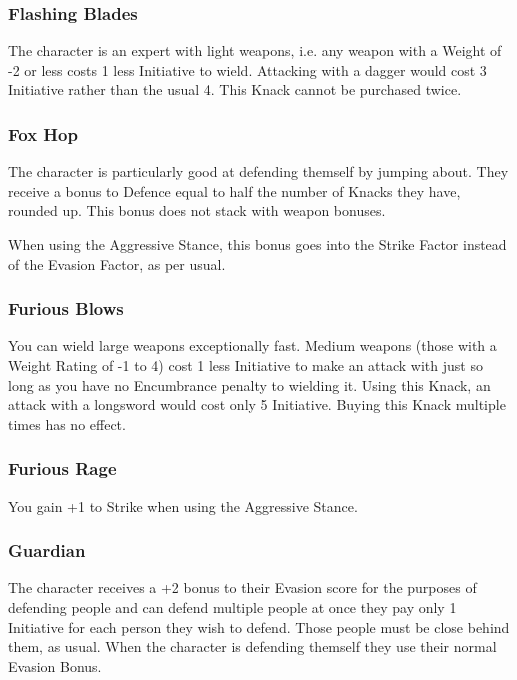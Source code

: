 \documentclass[titlepage,a4paper,openany]{book}
\begin{document}
\begin{multicols}{2}
\subsubsection{Flashing Blades}

The character is an expert with light weapons, i.e. any weapon with a Weight of -2 or less costs 1 less Initiative to wield. Attacking with a dagger would cost 3 Initiative rather than the usual 4.  This Knack cannot be purchased twice.

\subsubsection{Fox Hop}
The character is particularly good at defending themself by jumping about. They receive a bonus to Defence equal to half the number of Knacks they have, rounded up. This bonus does not stack with weapon bonuses.

When using the Aggressive Stance, this bonus goes into the Strike Factor instead of the Evasion Factor, as per usual.

\subsubsection{Furious Blows}\label{furiousblows}

You can wield large weapons exceptionally fast. Medium weapons (those with a Weight Rating of -1 to 4) cost 1 less Initiative to make an attack with just so long as you have no Encumbrance penalty to wielding it. Using this Knack, an attack with a longsword would cost only 5 Initiative. Buying this Knack multiple times has no effect.

\subsubsection{Furious Rage}

You gain +1 to Strike when using the Aggressive Stance.

\subsubsection{Guardian}

The character receives a +2 bonus to their Evasion score for the purposes of defending people and can defend multiple people at once they pay only 1 Initiative for each person they wish to defend. Those people must be close behind them, as usual. When the character is defending themself they use their normal Evasion Bonus.


\end{multicols}
\end{document}
